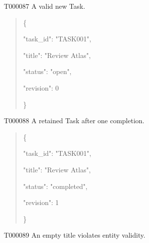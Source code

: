 \documentclass[11pt,a4paper]{article}
\begin{document}
\begin{atlasparagraph}{T000087}
A valid new Task.
\end{atlasparagraph}
\par\noindent\begin{minipage}{\linewidth}
\begin{quote}\small\ttfamily\raggedright
\noindent \{\par
\noindent   "task\_\allowbreak{}id":\allowbreak{} "TASK001",\par
\noindent   "title":\allowbreak{} "Review Atlas",\par
\noindent   "status":\allowbreak{} "open",\par
\noindent   "revision":\allowbreak{} 0\par
\noindent \}\par
\end{quote}
\end{minipage}\par
{}
\begin{atlasparagraph}{T000088}
A retained Task after one completion.
\end{atlasparagraph}
\par\noindent\begin{minipage}{\linewidth}
\begin{quote}\small\ttfamily\raggedright
\noindent \{\par
\noindent   "task\_\allowbreak{}id":\allowbreak{} "TASK001",\par
\noindent   "title":\allowbreak{} "Review Atlas",\par
\noindent   "status":\allowbreak{} "completed",\par
\noindent   "revision":\allowbreak{} 1\par
\noindent \}\par
\end{quote}
\end{minipage}\par
{}
\begin{atlasparagraph}{T000089}
An empty title violates entity validity.
\end{atlasparagraph}
\end{document}
